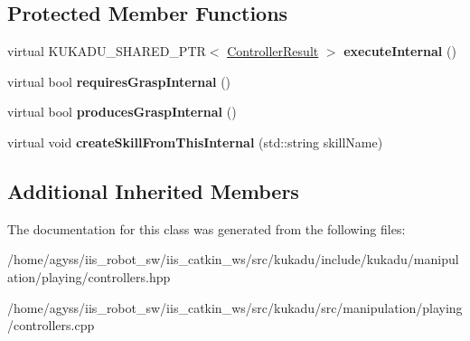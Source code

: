 \subsection*{Protected Member Functions}
\begin{DoxyCompactItemize}
\item 
virtual K\+U\+K\+A\+D\+U\+\_\+\+S\+H\+A\+R\+E\+D\+\_\+\+P\+TR$<$ \hyperlink{classkukadu_1_1ControllerResult}{Controller\+Result} $>$ {\bfseries execute\+Internal} ()\hypertarget{classkukadu_1_1ControllerActionClip_a6a6466feff66117942041f73c418e653}{}\label{classkukadu_1_1ControllerActionClip_a6a6466feff66117942041f73c418e653}

\item 
virtual bool {\bfseries requires\+Grasp\+Internal} ()\hypertarget{classkukadu_1_1ControllerActionClip_a2f314eca12237ffaba60323f02936667}{}\label{classkukadu_1_1ControllerActionClip_a2f314eca12237ffaba60323f02936667}

\item 
virtual bool {\bfseries produces\+Grasp\+Internal} ()\hypertarget{classkukadu_1_1ControllerActionClip_a48a78f3c15f4a3d2a34fa935c2912788}{}\label{classkukadu_1_1ControllerActionClip_a48a78f3c15f4a3d2a34fa935c2912788}

\item 
virtual void {\bfseries create\+Skill\+From\+This\+Internal} (std\+::string skill\+Name)\hypertarget{classkukadu_1_1ControllerActionClip_a68aaf7002259b0e627b920df30129559}{}\label{classkukadu_1_1ControllerActionClip_a68aaf7002259b0e627b920df30129559}

\end{DoxyCompactItemize}
\subsection*{Additional Inherited Members}


The documentation for this class was generated from the following files\+:\begin{DoxyCompactItemize}
\item 
/home/agyss/iis\+\_\+robot\+\_\+sw/iis\+\_\+catkin\+\_\+ws/src/kukadu/include/kukadu/manipulation/playing/controllers.\+hpp\item 
/home/agyss/iis\+\_\+robot\+\_\+sw/iis\+\_\+catkin\+\_\+ws/src/kukadu/src/manipulation/playing/controllers.\+cpp\end{DoxyCompactItemize}
